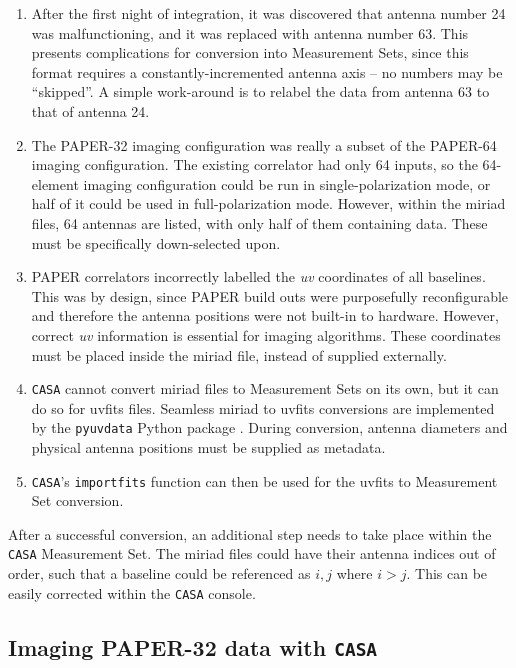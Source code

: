 \begin{enumerate}
\item After the first night of integration, it was discovered that antenna number 24 was malfunctioning, and it was replaced with antenna number 63. This presents complications for conversion into Measurement Sets, since this format requires a constantly-incremented antenna axis -- no numbers may be ``skipped''. A simple work-around is to relabel the data from antenna 63 to that of antenna 24.
\item The PAPER-32 imaging configuration was really a subset of the PAPER-64 imaging configuration. The existing correlator had only 64 inputs, so the 64-element imaging configuration could be run in single-polarization mode, or half of it could be used in full-polarization mode. However, within the {\sc miriad} files, 64 antennas are listed, with only half of them containing data. These must be specifically down-selected upon.
\item PAPER correlators incorrectly labelled the \textit{uv} coordinates of all baselines. This was by design, since PAPER build outs were purposefully reconfigurable and therefore the antenna positions were not built-in to hardware. However, correct \textit{uv} information is essential for imaging algorithms. These coordinates must be placed inside the {\sc miriad} file, instead of supplied externally.
\item {\tt CASA} cannot convert {\sc miriad} files to Measurement Sets on its own, but it can do so for {\sc uvfits} files. Seamless {\sc miriad} to {\sc uvfits} conversions are implemented by the {\tt pyuvdata} Python package \citep{pyuvdata}. During conversion, antenna diameters and physical antenna positions must be supplied as metadata.
\item {\tt CASA}'s {\tt importfits} function can then be used for the {\sc uvfits} to Measurement Set conversion.
\end{enumerate}

After a successful conversion, an additional step needs to take place within the {\tt CASA} Measurement Set. The {\sc miriad} files could have their antenna indices out of order, such that a baseline could be referenced as $i,j$ where $i>j$. This can be easily corrected within the {\tt CASA} console.

\subsection{Imaging PAPER-32 data with {\tt CASA}}

